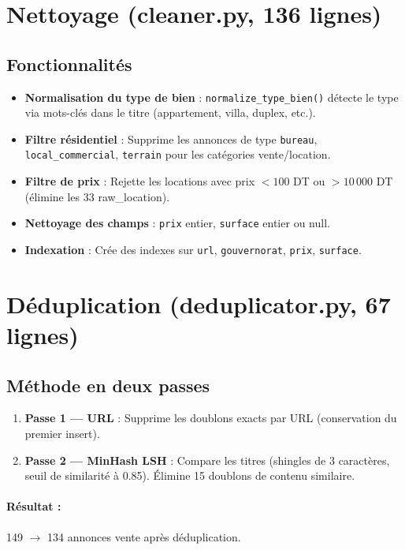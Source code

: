 \documentclass[12pt,a4paper]{report}
\begin{document}
\section{Nettoyage (cleaner.py, 136 lignes)}

\subsection{Fonctionnalités}
\begin{itemize}
    \item \textbf{Normalisation du type de bien} : \texttt{normalize\_type\_bien()} détecte le type via mots-clés dans le titre (appartement, villa, duplex, etc.).
    \item \textbf{Filtre résidentiel} : Supprime les annonces de type \texttt{bureau}, \texttt{local\_commercial}, \texttt{terrain} pour les catégories vente/location.
    \item \textbf{Filtre de prix} : Rejette les locations avec prix $< 100$ DT ou $> 10\,000$ DT (élimine les 33 raw\_location).
    \item \textbf{Nettoyage des champs} : \texttt{prix} entier, \texttt{surface} entier ou null.
    \item \textbf{Indexation} : Crée des indexes sur \texttt{url}, \texttt{gouvernorat}, \texttt{prix}, \texttt{surface}.
\end{itemize}

\section{Déduplication (deduplicator.py, 67 lignes)}

\subsection{Méthode en deux passes}
\begin{enumerate}
    \item \textbf{Passe 1 — URL} : Supprime les doublons exacts par URL (conservation du premier insert).
    \item \textbf{Passe 2 — MinHash LSH} : Compare les titres (shingles de 3 caractères, seuil de similarité à 0.85). Élimine 15 doublons de contenu similaire.
\end{enumerate}

\paragraph{Résultat :} 149 $\rightarrow$ 134 annonces vente après déduplication.
\end{document}
